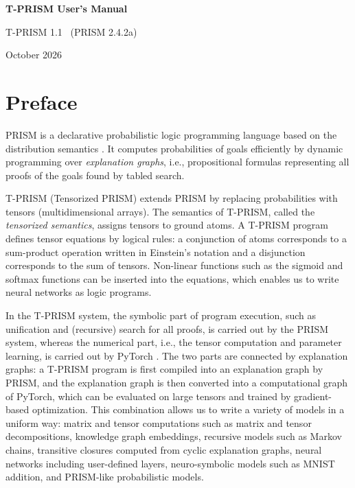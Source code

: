 \documentclass[a4paper]{report}
\begin{document}
	\begin{center}
		\par\vspace*{3cm}\par
		{\Huge\bf T-PRISM User's Manual}\par\vspace*{1cm}\par
		{\Large T-PRISM 1.1 \ (PRISM 2.4.2a)}\par\vspace*{0.5cm}\par
		{\large October 2026}\par\vspace*{10cm}\par
	\end{center}
	\thispagestyle{empty}
	\setcounter{page}{0}%
	\clearpage


\section*{Preface}

PRISM is a declarative probabilistic logic programming language based on
the distribution semantics \cite{Sato95}.  It computes probabilities of
goals efficiently by dynamic programming over {\em explanation graphs},
i.e., propositional formulas representing all proofs of the goals found
by tabled search.

T-PRISM (Tensorized PRISM) \cite{kojima2019tensorized} extends PRISM by
replacing probabilities with tensors (multidimensional arrays).  The
semantics of T-PRISM, called the {\em tensorized semantics}, assigns
tensors to ground atoms.  A T-PRISM program defines tensor equations by
logical rules: a conjunction of atoms corresponds to a sum-product
operation written in Einstein's notation and a disjunction corresponds
to the sum of tensors.  Non-linear functions such as the sigmoid and
softmax functions can be inserted into the equations, which enables us
to write neural networks as logic programs.

In the T-PRISM system, the symbolic part of program execution, such as
unification and (recursive) search for all proofs, is carried out by the
PRISM system, whereas the numerical part, i.e., the tensor computation
and parameter learning, is carried out by PyTorch
\cite{paszke2019pytorch}.  The two parts are connected by explanation
graphs: a T-PRISM program is first compiled into an explanation graph by
PRISM, and the explanation graph is then converted into a computational
graph of PyTorch, which can be evaluated on large tensors and trained by
gradient-based optimization.  This combination allows us to write a
variety of models in a uniform way: matrix and tensor computations such
as matrix and tensor decompositions, knowledge graph embeddings,
recursive models such as Markov chains, transitive closures computed
from cyclic explanation graphs, neural networks including user-defined
layers, neuro-symbolic models such as MNIST addition, and PRISM-like
probabilistic models.
\end{document}
